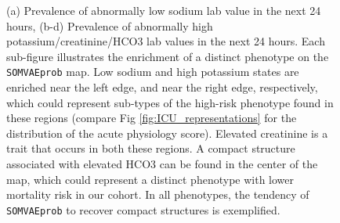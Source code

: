 \begin{figure}[h!]
\caption{(a) Prevalence of abnormally low sodium lab value in the next 24 
         hours, (b-d) Prevalence of abnormally high potassium/creatinine/HCO3 lab values in the next 24 hours. Each
         sub-figure illustrates the enrichment of a distinct phenotype on the \texttt{SOMVAEprob} map. Low sodium
         and high potassium states are enriched near the left edge, and near the right edge, respectively, which could
         represent sub-types of the high-risk phenotype found in these regions (compare Fig \ref{fig:ICU_representations}
         for the distribution of the acute physiology score). Elevated creatinine is a trait that occurs in both these regions.
         A compact structure associated with elevated HCO3 can be found in the center of the map, which could represent 
         a distinct phenotype with lower mortality risk in our cohort. In all phenotypes, the tendency of \texttt{SOMVAEprob}
         to recover compact structures is exemplified.}
\end{figure}
